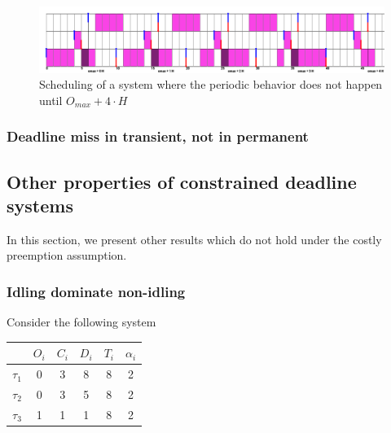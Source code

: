 \documentclass[a4paper,10pt]{article}
\begin{document}
        \begin{figure}[H]
        \begin{center}
            \centerline{\includegraphics[width=1.4\textwidth]{figs/longTransitive2_EDF.png}}
            \caption{Scheduling of a system where the periodic behavior does not happen until $O_{max} + 4 \cdot H$}
            \label{fig:edf_longtransitive}
        \end{center}
        \end{figure}

        \subsubsection{Deadline miss in transient, not in permanent}

    \subsection{Other properties of constrained deadline systems}


    In this section, we present other results which do not hold under the costly preemption assumption.

        \subsubsection{Idling dominate non-idling}

        Consider the following system

        \begin{center}
            \begin{tabular}{|r|c|c|c|c|c|}
                \hline
                            & $O_i$ & $C_i$ & $D_i$ & $T_i$ & $\alpha_i$ \\ \hline
                $\tau_1$    & 0     & 3     & 8    & 8     & 2     \\ \hline
                $\tau_2$    & 0     & 3     & 5    & 8     & 2     \\ \hline
                $\tau_3$    & 1     & 1     & 1    & 8     & 2     \\ \hline
            \end{tabular}
        \end{center}
\end{document}
